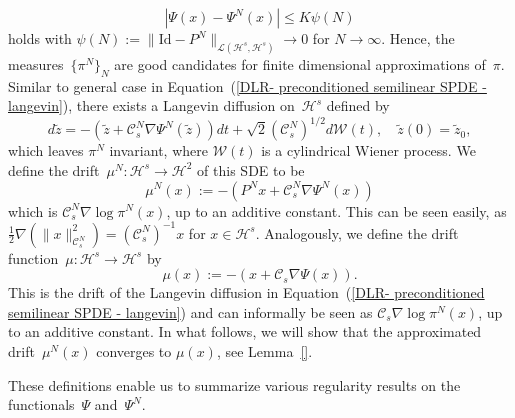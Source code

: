 \begin{equation*}
 | \Psi (x) - \Psi^N (x) | \leq K \psi(N) 
\end{equation*}
holds with $\psi(N) := \| \text{Id} - P^N \|_{\mathcal{L}(\mathcal{H}^s, \mathcal{H}^s)} \to 0$ for $N \to \infty$. Hence, the measures~$\{ \pi^N \}_N$ are good candidates for finite dimensional approximations of~$\pi$. Similar to general case in Equation~(\ref{DLR- preconditioned semilinear SPDE - langevin}), there exists a Langevin diffusion on~$\mathcal{H}^s$ defined by
\begin{equation}
 d \tilde{z} = - ( \tilde{z} + \mathcal{C}_s^N \nabla \Psi^N (\tilde{z}) ) dt + \sqrt{2} (\mathcal{C}_s^N)^{1/2} d \mathcal{W}(t), \quad \tilde{z}(0) = \tilde{z}_0,
\end{equation}
which  leaves $ \pi^{N} $ invariant, where $\mathcal{W}(t)$ is a cylindrical Wiener process. We define the drift~$\mu^N: \mathcal{H}^s \to \mathcal{H}^2$ of this SDE to be
\begin{equation}
\label{DLR-Setting: Definition aproximated drift mu^N}
 \mu^N (x) := - \left(  P^N x + \mathcal{C}_s^N \nabla \Psi^N (x)  \right)
\end{equation}
which is $ \mathcal{C}_s^{N} \nabla \log \pi^{N} (x) $, up to an additive constant. This can be seen easily, as $ \tfrac{1}{2}  \nabla \left( \| x \|_{\mathcal{C}_s^N}^2 \right) = (\mathcal{C}_s^N)^{-1} x  $ for $x \in \mathcal{H}^s$. Analogously, we define the drift function~$\mu : \mathcal{H}^s \to \mathcal{H}^s$ by
\begin{equation}
\label{DLR-Setting: Definition drift mu}
 \mu(x) := - (x + \mathcal{C}_s \nabla \Psi (x) ).
\end{equation}
This is the drift of the Langevin diffusion in Equation~(\ref{DLR- preconditioned semilinear SPDE - langevin}) and can informally be seen as  $ \mathcal{C}_s \nabla \log \pi^{N} (x) $, up to an additive constant. In what follows, we will show that the approximated drift~$\mu^N(x)$ converges to $\mu(x)$, see Lemma~\ref{}.

These definitions enable us to summarize various regularity results on the functionals~$\Psi$ and~$\Psi^N$.


